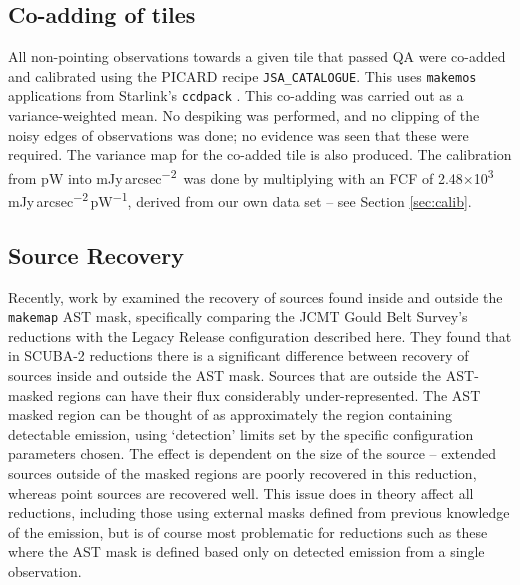 \documentclass[twocolumn,times]{aastex6}
\newcommand{\um}{\micron}
\newcommand{\todo}[1]{\textcolor{red}{TODO: #1}}
\newcommand{\ascl}[1]{\href{http://www.ascl.net/#1}{ascl:#1}}
\newcommand{\jyas}{Jy\,arcsec\textsuperscript{$-$2}}
\begin{document}



\subsection{Co-adding of tiles}
\label{sec:coadd}
All non-pointing observations towards a given tile that passed QA were
co-added and calibrated using the PICARD recipe
\texttt{JSA\_CATALOGUE}. This uses \texttt{makemos} applications from
Starlink's \texttt{ccdpack} \citep[][\ascl{1403.021}]{SUN139}. This
co-adding was carried out as a variance-weighted mean. No despiking
was performed, and no clipping of the noisy edges of observations was
done; no evidence was seen that these were required. The variance map
for the co-added tile is also produced. The calibration from pW into
m\jyas\ was done by multiplying with an FCF of
2.48$\times$10\textsuperscript{3}\,m\jyas\,pW\textsuperscript{$-$1},
derived from our own data set -- see Section \ref{sec:calib}.

\subsection{Source Recovery}
Recently, work by \citet{Mairs2015} examined the recovery of sources
found inside and outside the \texttt{makemap} AST mask, specifically comparing
the JCMT Gould Belt Survey's reductions with the Legacy Release configuration
described here. They found that in SCUBA-2 reductions there is a
significant difference between recovery of sources inside and outside
the AST mask. Sources that are outside the AST-masked regions can have
their flux considerably under-represented. The AST masked region can be
thought of as approximately the region containing detectable emission,
using `detection' limits set by the specific configuration parameters
chosen. The effect is dependent on the size of the source -- extended
sources outside of the masked regions are poorly recovered in this
reduction, whereas point sources are recovered well.  This issue does
in theory affect all reductions, including those using external masks
defined from previous knowledge of the emission, but is of course most
problematic for reductions such as these where the AST mask is defined
based only on detected emission from a single observation.
\end{document}
